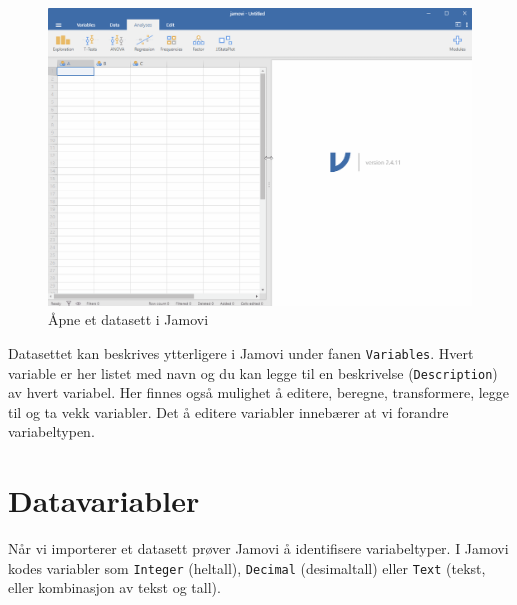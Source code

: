 \documentclass[
  letterpaper,
  DIV=11,
  numbers=noendperiod,
  oneside]{scrreprt}
\begin{document}
\begin{figure}

{\centering \includegraphics{img/01-jamovi/open-file.gif}

}

\caption{\label{fig-openfile}Åpne et datasett i Jamovi}

\end{figure}

Datasettet kan beskrives ytterligere i Jamovi under fanen
\texttt{Variables}. Hvert variable er her listet med navn og du kan
legge til en beskrivelse (\texttt{Description}) av hvert variabel. Her
finnes også mulighet å editere, beregne, transformere, legge til og ta
vekk variabler. Det å editere variabler innebærer at vi forandre
variabeltypen.

\hypertarget{datavariabler}{%
\section{Datavariabler}\label{datavariabler}}

Når vi importerer et datasett prøver Jamovi å identifisere
variabeltyper. I Jamovi kodes variabler som \texttt{Integer} (heltall),
\texttt{Decimal} (desimaltall) eller \texttt{Text} (tekst, eller
kombinasjon av tekst og tall).

\end{document}
